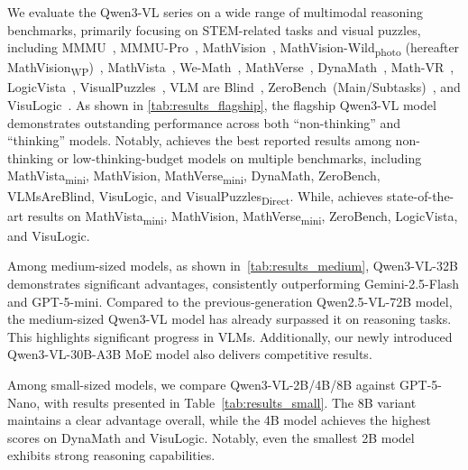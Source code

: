 We evaluate the Qwen3-VL series on a wide range of multimodal reasoning benchmarks, primarily focusing on STEM-related tasks and visual puzzles, including MMMU~\citep{yue2024mmmu}, MMMU-Pro~\citep{yue2024mmmupro}, MathVision~\citep{wang2024measuring},  MathVision-Wild\textsubscript{\scriptsize photo} (hereafter MathVision\textsubscript{\scriptsize WP})~, MathVista~\citep{lu2023mathvista}, We-Math~\citep{qiao2024we}, MathVerse~\citep{zhang2024mathverse}, DynaMath~\citep{zou2024dynamath}, Math-VR~\citep{duan2025codeplot}, LogicVista~\citep{xiao2024logicvista}, VisualPuzzles~\citep{song2025visualpuzzles},  VLM are Blind~\citep{rahmanzadehgervi2025visionlanguagemodelsblind}, ZeroBench~(Main/Subtasks)~\citep{roberts2025zerobenchimpossiblevisualbenchmark}, and VisuLogic~\citep{xu2025visulogicbenchmarkevaluatingvisual}. As shown in \cref{tab:results_flagship}, the flagship Qwen3-VL model demonstrates outstanding performance across both “non-thinking” and “thinking” models. Notably, \InstructBig achieves the best reported results among non-thinking or low-thinking-budget models on multiple benchmarks, including MathVista\textsubscript{mini}, MathVision, MathVerse\textsubscript{mini}, DynaMath, ZeroBench, VLMsAreBlind, VisuLogic, and VisualPuzzles\textsubscript{Direct}. While, \ThinkBig achieves state-of-the-art results on MathVista\textsubscript{mini}, MathVision, MathVerse\textsubscript{mini}, ZeroBench, LogicVista, and VisuLogic. 

Among medium-sized models, as shown in~\cref{tab:results_medium}, Qwen3-VL-32B demonstrates significant advantages, consistently outperforming Gemini-2.5-Flash and GPT-5-mini. Compared to the previous-generation Qwen2.5-VL-72B model, the medium-sized Qwen3-VL model has already surpassed it on reasoning tasks. This highlights significant progress in VLMs. Additionally, our newly introduced Qwen3-VL-30B-A3B MoE model also delivers competitive results.

Among small-sized models, we compare Qwen3-VL-2B/4B/8B against GPT-5-Nano, with results presented in Table~\ref{tab:results_small}. The 8B variant maintains a clear advantage overall, while the 4B model achieves the highest scores on DynaMath and VisuLogic. Notably, even the smallest 2B model exhibits strong reasoning capabilities. 
